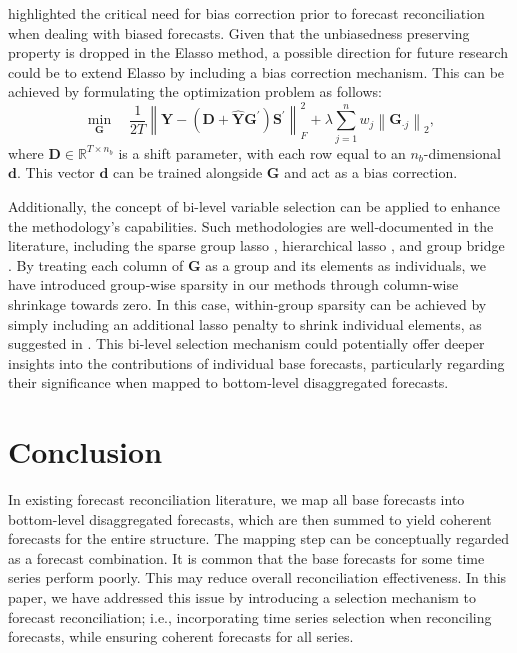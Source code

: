 \documentclass[
  11pt]{article}
\theoremstyle{plain}
\theoremstyle{remark}
\begin{document}
\citet{Panagiotelis2021-mf} highlighted the critical need for bias
correction prior to forecast reconciliation when dealing with biased
forecasts. Given that the unbiasedness preserving property is dropped in
the Elasso method, a possible direction for future research could be to
extend Elasso by including a bias correction mechanism. This can be
achieved by formulating the optimization problem as follows: \[
\min_{\bm{G}} \quad \frac{1}{2 T} \left\|\bm{Y}-\left(\bm{D} + \hat{\bm{Y}} \bm{G}^{\prime}\right)\bm{S}^{\prime}\right\|_F^2 + \lambda \sum_{j=1}^n w_j \left\|\bm{G}_{\cdot j}\right\|_2,
\] where \(\bm{D} \in \mathbb{R}^{T \times n_b}\) is a shift parameter,
with each row equal to an \(n_b\)-dimensional \(\bm{d}\). This vector
\(\bm{d}\) can be trained alongside \(\bm{G}\) and act as a bias
correction.

Additionally, the concept of bi-level variable selection can be applied
to enhance the methodology's capabilities. Such methodologies are
well‑documented in the literature, including the sparse group lasso
\citep{Simon2013-sp}, hierarchical lasso \citep{Zhou2010-vs}, and group
bridge \citep{Huang2009-vs}. By treating each column of \(\bm{G}\) as a
group and its elements as individuals, we have introduced group‑wise
sparsity in our methods through column-wise shrinkage towards zero. In
this case, within-group sparsity can be achieved by simply including an
additional lasso penalty to shrink individual elements, as suggested in
\citet{Simon2013-sp}. This bi-level selection mechanism could
potentially offer deeper insights into the contributions of individual
base forecasts, particularly regarding their significance when mapped to
bottom‑level disaggregated forecasts.

\section{Conclusion}\label{sec-conclusion}


In existing forecast reconciliation literature, we map all base
forecasts into bottom-level disaggregated forecasts, which are then
summed to yield coherent forecasts for the entire structure. The mapping
step can be conceptually regarded as a forecast combination. It is
common that the base forecasts for some time series perform poorly. This
may reduce overall reconciliation effectiveness. In this paper, we have
addressed this issue by introducing a selection mechanism to forecast
reconciliation; i.e., incorporating time series selection when
reconciling forecasts, while ensuring coherent forecasts for all series.
\end{document}
